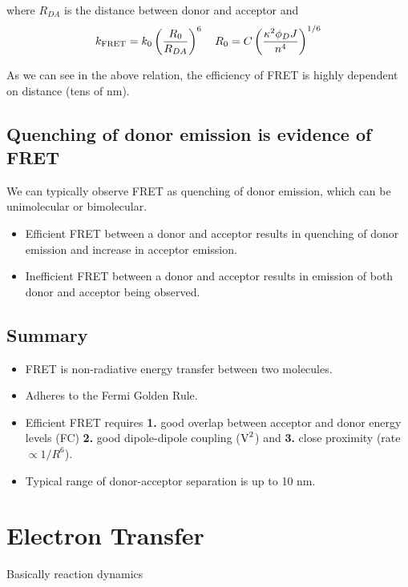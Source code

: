 \documentclass[a4paper]{tufte-handout}
\theoremstyle{definition}
\begin{document}
where $R_{DA}$ is the distance between donor and acceptor and 
$$k_{\ce{FRET}} = k_0 \left( \frac{R_0}{R_{DA}} \right)^6 \quad R_0= C\left( \frac{\kappa^2 \phi_D J}{n^4}\right)^{1/6}$$

As we can see in the above relation, the efficiency of FRET is highly dependent on distance (tens of nm).

\subsection*{Quenching of donor emission is evidence of FRET}

We can typically observe FRET as quenching of donor emission, which can be unimolecular or bimolecular. 

\begin{itemize}
  \item Efficient FRET between a donor and acceptor results in quenching of donor emission and increase in acceptor emission.
  \item Inefficient FRET between a donor and acceptor results in emission of both donor and acceptor being observed.
\end{itemize}

\subsection*{Summary}

\begin{itemize}
  \item FRET is non-radiative energy transfer between two molecules.
  \item Adheres to the Fermi Golden Rule.
  \item Efficient FRET requires \textbf{1.} good overlap between acceptor and donor energy levels (FC) \textbf{2.} good dipole-dipole coupling ($\ce{V^2}$) and \textbf{3.} close proximity (rate $\propto 1/R^6$).
  \item Typical range of donor-acceptor separation is up to 10 nm.
\end{itemize}


\section{Electron Transfer}

Basically reaction dynamics



\end{document}
